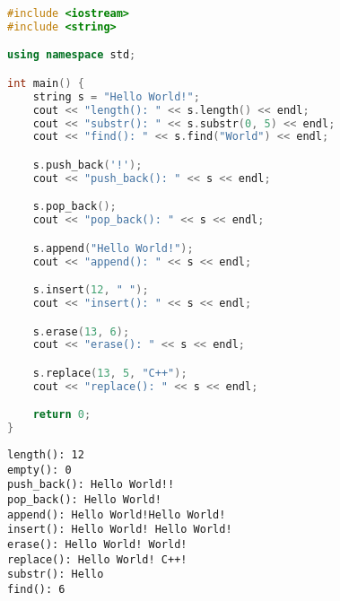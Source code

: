 \vspace{0.5cm}


\begin{lstlisting}[language=C++]
#include <iostream>
#include <string>

using namespace std;

int main() {
	string s = "Hello World!";
	cout << "length(): " << s.length() << endl;
	cout << "substr(): " << s.substr(0, 5) << endl;
	cout << "find(): " << s.find("World") << endl;

	s.push_back('!');
	cout << "push_back(): " << s << endl;

	s.pop_back();
	cout << "pop_back(): " << s << endl;

	s.append("Hello World!");
	cout << "append(): " << s << endl;

	s.insert(12, " ");
	cout << "insert(): " << s << endl;

	s.erase(13, 6);
	cout << "erase(): " << s << endl;

	s.replace(13, 5, "C++");
	cout << "replace(): " << s << endl;

	return 0;
}
\end{lstlisting}

\begin{tcolorbox}
	\begin{verbatim}
length(): 12
empty(): 0
push_back(): Hello World!!
pop_back(): Hello World!
append(): Hello World!Hello World!
insert(): Hello World! Hello World!
erase(): Hello World! World!
replace(): Hello World! C++!
substr(): Hello
find(): 6
	\end{verbatim}
\end{tcolorbox}

\newpage